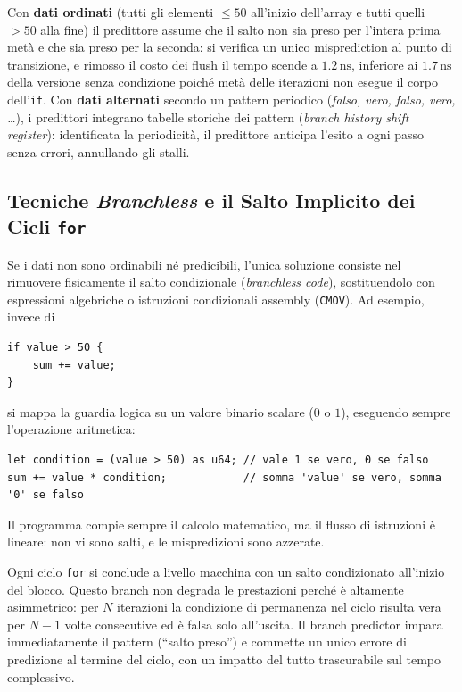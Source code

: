 Con \textbf{dati ordinati} (tutti gli elementi $\le 50$ all'inizio dell'array e tutti quelli $> 50$ alla fine) il predittore assume che il salto non sia preso per l'intera prima met\`a e che sia preso per la seconda: si verifica un unico misprediction al punto di transizione, e rimosso il costo dei flush il tempo scende a $1.2\,\text{ns}$, inferiore ai $1.7\,\text{ns}$ della versione senza condizione poich\'e met\`a delle iterazioni non esegue il corpo dell'\texttt{if}. Con \textbf{dati alternati} secondo un pattern periodico (\textit{falso, vero, falso, vero, \ldots}), i predittori integrano tabelle storiche dei pattern (\textit{branch history shift register}): identificata la periodicit\`a, il predittore anticipa l'esito a ogni passo senza errori, annullando gli stalli.

\subsection{Tecniche \textit{Branchless} e il Salto Implicito dei Cicli \texttt{for}}

Se i dati non sono ordinabili n\'e predicibili, l'unica soluzione consiste nel rimuovere fisicamente il salto condizionale (\textit{branchless code}), sostituendolo con espressioni algebriche o istruzioni condizionali assembly (\texttt{CMOV}). Ad esempio, invece di
\begin{lstlisting}[style=rustcode]
if value > 50 {
    sum += value;
}
\end{lstlisting}
si mappa la guardia logica su un valore binario scalare ($0$ o $1$), eseguendo sempre l'operazione aritmetica:
\begin{lstlisting}[style=rustcode]
let condition = (value > 50) as u64; // vale 1 se vero, 0 se falso
sum += value * condition;            // somma 'value' se vero, somma '0' se falso
\end{lstlisting}
Il programma compie sempre il calcolo matematico, ma il flusso di istruzioni \`e lineare: non vi sono salti, e le mispredizioni sono azzerate.

\begin{remark}
Ogni ciclo \texttt{for} si conclude a livello macchina con un salto condizionato all'inizio del blocco. Questo branch non degrada le prestazioni perch\'e \`e altamente asimmetrico: per $N$ iterazioni la condizione di permanenza nel ciclo risulta vera per $N-1$ volte consecutive ed \`e falsa solo all'uscita. Il branch predictor impara immediatamente il pattern (``salto preso'') e commette un unico errore di predizione al termine del ciclo, con un impatto del tutto trascurabile sul tempo complessivo.
\end{remark}

